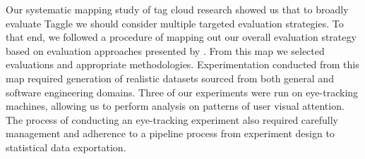Our systematic mapping study of tag cloud research showed us that to broadly evaluate Taggle we should consider multiple targeted evaluation strategies. To that end, we followed a procedure of mapping out our overall evaluation strategy based on evaluation approaches presented by \citet{lam12}. From this map we selected evaluations and appropriate methodologies. Experimentation conducted from this map required generation of realistic datasets sourced from both general and software engineering domains. Three of our experiments were run on eye-tracking machines, allowing us to perform analysis on patterns of user visual attention. The process of conducting an eye-tracking experiment also required carefully management and adherence to a pipeline process from experiment design to statistical data exportation. 



